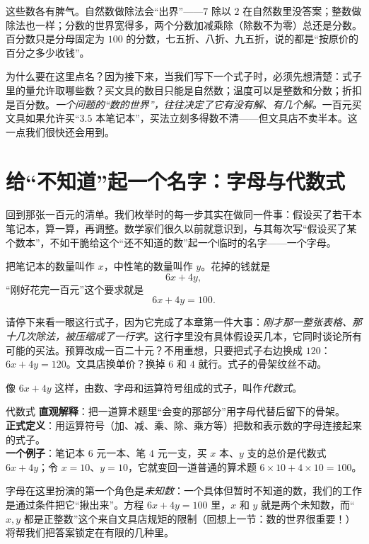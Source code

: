 这些数各有脾气。自然数做除法会“出界”——$7$ 除以 $2$ 在自然数里没答案；整数做除法也一样；分数的世界宽得多，两个分数加减乘除（除数不为零）总还是分数。百分数只是分母固定为 $100$ 的分数，七五折、八折、九五折，说的都是“按原价的百分之多少收钱”。

为什么要在这里点名？因为接下来，当我们写下一个式子时，必须先想清楚：式子里的量允许取哪些数？买文具的数目只能是自然数；温度可以是整数和分数；折扣是百分数。\emph{一个问题的“数的世界”，往往决定了它有没有解、有几个解。}一百元买文具如果允许买“$3.5$ 本笔记本”，买法立刻多得数不清——但文具店不卖半本。这一点我们很快还会用到。

\section{给“不知道”起一个名字：字母与代数式}

回到那张一百元的清单。我们枚举时的每一步其实在做同一件事：假设买了若干本笔记本，算一算，再调整。数学家们很久以前就意识到，与其每次写“假设买了某个数本”，不如干脆给这个“还不知道的数”起一个临时的名字——一个字母。

把笔记本的数量叫作 $x$，中性笔的数量叫作 $y$。花掉的钱就是
\[
6x+4y,
\]
“刚好花完一百元”这个要求就是
\[
6x+4y=100.
\]

请停下来看一眼这行式子，因为它完成了本章第一件大事：\emph{刚才那一整张表格、那十几次除法，被压缩成了一行字}。这行字里没有具体假设买几本，它同时谈论所有可能的买法。预算改成一百二十元？不用重想，只要把式子右边换成 $120$：$6x+4y=120$。文具店换单价？换掉 $6$ 和 $4$ 就行。式子的骨架纹丝不动。

像 $6x+4y$ 这样，由数、字母和运算符号组成的式子，叫作\emph{代数式}。

\begin{shuyu}{代数式}
\textbf{直观解释}：把一道算术题里“会变的那部分”用字母代替后留下的骨架。\\
\textbf{正式定义}：用运算符号（加、减、乘、除、乘方等）把数和表示数的字母连接起来的式子。\\
\textbf{一个例子}：笔记本 $6$ 元一本、笔 $4$ 元一支，买 $x$ 本、$y$ 支的总价是代数式 $6x+4y$；令 $x=10$、$y=10$，它就变回一道普通的算术题 $6\times10+4\times10=100$。
\end{shuyu}

字母在这里扮演的第一个角色是\emph{未知数}：一个具体但暂时不知道的数，我们的工作是通过条件把它“揪出来”。方程 $6x+4y=100$ 里，$x$ 和 $y$ 就是两个未知数，而“$x,y$ 都是正整数”这个来自文具店规矩的限制（回想上一节：数的世界很重要！）将帮我们把答案锁定在有限的几种里。

